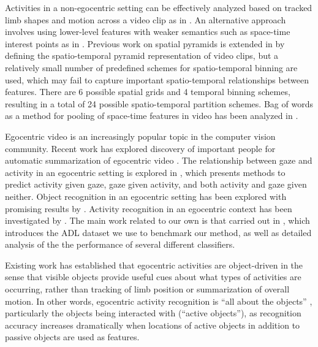 \documentclass{bmvc2k}
\begin{document}
  Activities in a non-egocentric setting can be effectively analyzed based
  on tracked limb shapes and motion across a video clip as in 
  \cite{Ramanan03, Rao01, Rodriguez08}. An
  alternative approach involves using lower-level features with weaker
  semantics such as space-time interest points as in \cite{Schuldt04,
  Laptev08}.
  Previous work on spatial pyramids \cite{Bosch07, Lazebnik06} is
  extended in \cite{Laptev08}
  by defining the spatio-temporal pyramid representation of video clips, but
  a relatively small number of predefined schemes for spatio-temporal
  binning are used,
  which may fail to capture important spatio-temporal relationships between
  features. There are 6 possible spatial grids and 4 temporal binning
  schemes, resulting in a total of 24 possible spatio-temporal partition
  schemes.
  Bag of words as a method for pooling of space-time features in video has been
  analyzed in \cite{Choi08, Laptev08, Ramanan12,Marszalek09, Fathi11_}.




  Egocentric video is an increasingly popular topic in the computer vision
  community. Recent work has explored discovery of important people for
  automatic summarization of egocentric
  video \cite{Lee12}. The relationship between gaze and activity in an
  egocentric setting is explored in \cite{Fathi12}, which presents methods
  to predict activity given gaze, gaze given activity, and both activity and
  gaze given neither. Object recognition in an egocentric setting has been
  explored with promising results by \cite{Ramanan12, Fathi11, Ren09}.
  Activity recognition in an egocentric context has been investigated by
  \cite{Ramanan12, Fathi11_}.
  The main work related to our own is that carried out in \cite{Ramanan12}, 
  which introduces the ADL dataset we use to benchmark our method, 
  as well as detailed analysis of the the
	performance of several different classifiers. 
	
  Existing work has established that egocentric activities are object-driven
  in the sense that visible objects provide useful cues about what types of
  activities are occurring, rather than tracking of limb position or
  summarization of overall motion. In other words,
	egocentric activity recognition is ``all about
  the objects'' \cite{Ramanan12}, particularly the objects being interacted
  with (``active objects''), as
	recognition accuracy increases dramatically when locations of active
  objects in addition to passive objects are used as features. 
\end{document}

